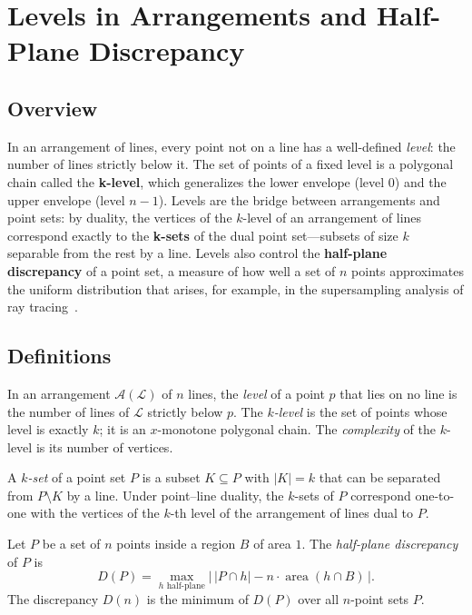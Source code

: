 \section{Levels in Arrangements and Half-Plane Discrepancy}
\label{sec:arrangement_levels}

\subsection{Overview}
In an arrangement of lines, every point not on a line has a well-defined
\emph{level}: the number of lines strictly below it. The set of points of a
fixed level is a polygonal chain called the \textbf{k-level},
which generalizes the lower envelope (level $0$) and the upper envelope (level
$n-1$). Levels are the bridge between arrangements and point sets: by duality,
the vertices of the $k$-level of an arrangement of lines correspond exactly to
the \textbf{k-sets} of the dual point set---subsets of size $k$ separable from
the rest by a line. Levels also control the \textbf{half-plane
discrepancy} of a point set, a measure of how
well a set of $n$ points approximates the uniform distribution that arises,
for example, in the supersampling analysis of ray tracing~\cite{sharir1995}.

\subsection{Definitions}

\begin{definition}\label{def:point_level}
In an arrangement $\mathcal{A}(\mathcal{L})$ of $n$ lines, the \emph{level} of
a point $p$ that lies on no line is the number of lines of $\mathcal{L}$
strictly below $p$. The \emph{$k$-level} is the set of points whose level is
exactly $k$; it is an $x$-monotone polygonal chain. The \emph{complexity} of
the $k$-level is its number of vertices.
\end{definition}

\begin{definition}[k-Set]\label{def:kset}
A \emph{$k$-set} of a point set $P$ is a subset $K \subseteq P$ with $|K| = k$
that can be separated from $P \setminus K$ by a line. Under point--line
duality, the $k$-sets of $P$ correspond one-to-one with the vertices of the
$k$-th level of the arrangement of lines dual to $P$.
\end{definition}

\begin{definition}\label{def:halfplane_discrepancy}
Let $P$ be a set of $n$ points inside a region $B$ of area $1$. The
\emph{half-plane discrepancy} of $P$ is
\[
D(P) = \max_{h \text{ half-plane}} \bigl|\, |P \cap h| - n \cdot \operatorname{area}(h \cap B) \,\bigr|.
\]
The discrepancy $D(n)$ is the minimum of $D(P)$ over all $n$-point sets $P$.
\end{definition}

